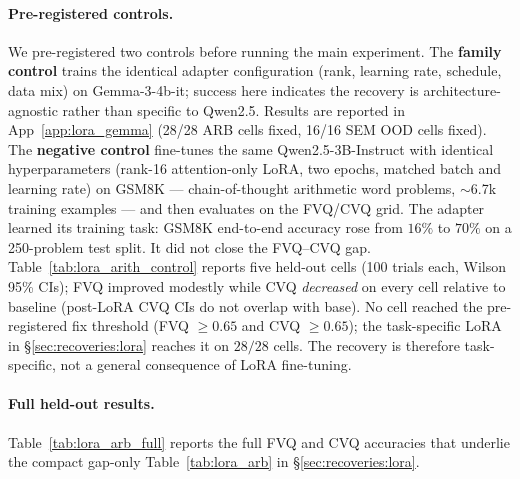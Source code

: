 \documentclass[11pt]{article}
\begin{document}
\paragraph{Pre-registered controls.}
We pre-registered two controls before running the main experiment.
The \textbf{family control} trains the identical adapter
configuration (rank, learning rate, schedule, data mix) on
Gemma-3-4b-it; success here indicates the recovery is
architecture-agnostic rather than specific to Qwen2.5. Results
are reported in App~\ref{app:lora_gemma} (28/28 ARB cells fixed,
16/16 SEM OOD cells fixed).
The \textbf{negative control} fine-tunes the same Qwen2.5-3B-Instruct
with identical hyperparameters (rank-16 attention-only LoRA, two
epochs, matched batch and learning rate) on GSM8K --- chain-of-thought
arithmetic word problems, $\sim$6.7k training examples --- and then
evaluates on the FVQ/CVQ grid. The adapter learned its training
task: GSM8K end-to-end accuracy rose from $16\%$ to $70\%$ on a
250-problem test split. It did not close the FVQ--CVQ gap.
Table~\ref{tab:lora_arith_control} reports five held-out cells
(100 trials each, Wilson 95\% CIs); FVQ improved modestly while CVQ
\emph{decreased} on every cell relative to baseline (post-LoRA CVQ
CIs do not overlap with base). No cell reached the pre-registered
fix threshold (FVQ $\geq 0.65$ and CVQ $\geq 0.65$); the
task-specific LoRA in \S\ref{sec:recoveries:lora} reaches it on
$28/28$ cells. The recovery is therefore task-specific, not a
general consequence of LoRA fine-tuning.

\paragraph{Full held-out results.}
Table~\ref{tab:lora_arb_full} reports the full FVQ and CVQ
accuracies that underlie the compact gap-only Table~\ref{tab:lora_arb}
in \S\ref{sec:recoveries:lora}.
\end{document}
